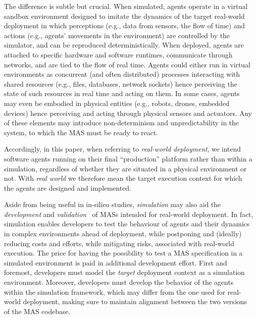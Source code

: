 The difference is subtle but crucial.
%
When simulated,
agents operate in a virtual sandbox environment
designed to imitate the dynamics of the target real-world deployment
in which perceptions (e.g., data from sensors, the flow of time)
and actions (e.g., agents' movements in the environment)
are controlled by the simulator,
and can be reproduced deterministically.
%
When deployed, agents are attached to specific hardware and software runtimes,
communicate through networks, and are tied to the flow of real time.
%
Agents could either run in virtual environments as concurrent
(and often distributed) processes
interacting with shared resources
(e.g., files, databases, network sockets)
hence perceiving the state of such resources in real time and acting on them.
In some cases, agents may even be embodied in physical entities
(e.g., robots, drones, embedded devices)
hence perceiving and acting through physical sensors and actuators.
%
Any of these elements may introduce non-determinism and unpredictability in the system,
to which the \ac{MAS} must be ready to react.

Accordingly, in this paper, when referring to \emph{real-world deployment},
we intend software agents running on their final ``production'' platform
rather than within a simulation,
regardless of whether they are situated in a physical environment or not.
With \emph{real world} we therefore mean the target execution context for which the agents
are designed and implemented.

Aside from being useful in in-silico studies,
\emph{simulation} may also aid the \emph{development} and \emph{validation}~\cite{uhrmacher_simulation_2002}
of \acp{MAS} intended for real-world deployment.
%
In fact, simulation enables developers to test the behaviour of agents
and their dynamics in complex environments ahead of deployment,
while postponing and (ideally) reducing costs and efforts, while mitigating risks, associated with real-world execution.
%
%
The price for
having the possibility to test a \ac{MAS} specification in a simulated environment
is paid in additional development effort.
First and foremost, developers must model the \emph{target} deployment context as a simulation environment.
%
Moreover, developers must develop the behavior of the agents within the simulation framework, which may differ from the one used for real-world deployment, making sure
to maintain alignment between the two versions of the \ac{MAS} codebase.

